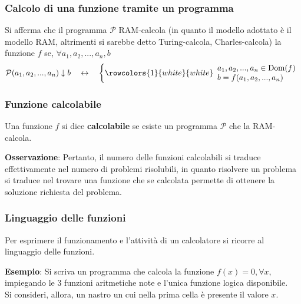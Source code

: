 \documentclass[a4paper]{extarticle}
\begin{document}
\vspace{1em}
\subsubsection{Calcolo di una funzione tramite un programma}
Si afferma che il programma \(\mathcal{P}\) RAM-calcola (in quanto il modello adottato è il modello RAM, altrimenti si sarebbe detto Turing-calcola, Charles-calcola) la funzione \(f\) se, \(\forall a_1, a_2, ..., a_n, b\)
\[\mathcal{P}(a_1, a_2, ..., a_n) \downarrow b \hspace{1em} \leftrightarrow \hspace{1em}
    \left\{
        \rowcolors{1}{white}{white}
        \begin{array}{l}
             a_1, a_2, ..., a_n \in \text{Dom}(f)\\
             b = f(a_1, a_2, ..., a_n)
        \end{array}
    \right.
\]

\vspace{1em}
\subsubsection{Funzione calcolabile}
Una funzione \(f\) si dice \textbf{calcolabile} se esiste un programma \(\mathcal{P}\) che la RAM-calcola.

\vspace{1em}
\noindent
\textbf{Osservazione}: Pertanto, il numero delle funzioni calcolabili si traduce effettivamente nel numero di problemi risolubili, in quanto risolvere un problema si traduce nel trovare una funzione che se calcolata permette di ottenere la soluzione richiesta del problema.

\vspace{1em}
\subsubsection{Linguaggio delle funzioni}
Per esprimere il funzionamento e l'attività di un calcolatore si ricorre al linguaggio delle funzioni.

\vspace{1em}
\noindent
\textbf{Esempio}: Si scriva un programma che calcola la funzione \(f(x) = 0, \forall x\), impiegando le \(3\) funzioni aritmetiche note e l'unica funzione logica disponibile.\\
Si consideri, allora, un nastro un cui nella prima cella è presente il valore \(x\).
\end{document}
